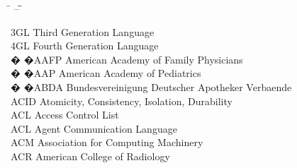 \begin{tabbing}
    \hspace{1cm} \= \hspace{2cm} -- \= \hspace{1.5cm}\= \kill

    \>3GL \>\>Third Generation Language\\

    \>4GL \>\>Fourth Generation Language\\




 � �\>AAFP \>\>American Academy of Family Physicians\\

 � �\>AAP \>\>American Academy of Pediatrics\\

 � �\>ABDA \>\>Bundesvereinigung Deutscher Apotheker Verbaende\\


    \>ACID \>\>Atomicity, Consistency, Isolation, Durability\\

    \>ACL \>\>Access Control List\\

    \>ACL \>\>Agent Communication Language\\

    \>ACM \>\>Association for Computing Machinery\\

    \>ACR \>\>American College of Radiology\\







\end{tabbing}
